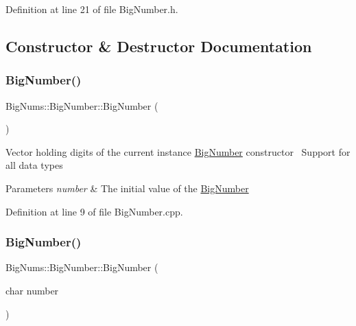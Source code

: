 Definition at line 21 of file Big\+Number.\+h.



\subsection{Constructor \& Destructor Documentation}
\mbox{\label{class_big_nums_1_1_big_number_a1567531627c79b2018363684cec9ed34}} 
\subsubsection{\texorpdfstring{BigNumber()}{BigNumber()}\hspace{0.1cm}{\footnotesize\ttfamily [1/16]}}
{\footnotesize\ttfamily Big\+Nums\+::\+Big\+Number\+::\+Big\+Number (\begin{DoxyParamCaption}{ }\end{DoxyParamCaption})}

Vector holding digits of the current instance \mbox{\hyperlink{class_big_nums_1_1_big_number}{Big\+Number}} constructor~\newline
Support for all data types 
\begin{DoxyParams}{Parameters}
{\em number} & The initial value of the \mbox{\hyperlink{class_big_nums_1_1_big_number}{Big\+Number}} \\
\hline
\end{DoxyParams}


Definition at line 9 of file Big\+Number.\+cpp.

\mbox{\label{class_big_nums_1_1_big_number_a10752ca000f0362291294fc9d96a17fb}} 
\subsubsection{\texorpdfstring{BigNumber()}{BigNumber()}\hspace{0.1cm}{\footnotesize\ttfamily [2/16]}}
{\footnotesize\ttfamily Big\+Nums\+::\+Big\+Number\+::\+Big\+Number (\begin{DoxyParamCaption}\item[{char}]{number }\end{DoxyParamCaption})\hspace{0.3cm}{\ttfamily [explicit]}}



